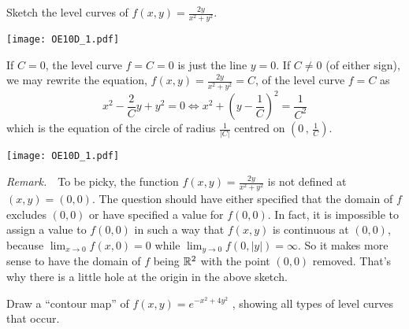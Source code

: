 
\begin{question}[M200 2010D] %
Sketch the level curves of $f(x,y)=\frac{2y}{x^2+y^2}$.
\end{question}

%

\begin{answer}
\begin{center}
     \texttt{[image: OE10D\_1.pdf]}
\end{center}
\end{answer}

\begin{solution}
 If $C=0$, the level curve $f=C=0$ is just the line $y=0$.
If $C\ne 0$ (of either sign), we may rewrite the equation, $f(x,y)=\frac{2y}{x^2+y^2}=C$,
of the level curve $f=C$ as 
\begin{equation*}
x^2-\frac{2}{C}y+y^2=0
\iff x^2+\left(y-\frac{1}{C}\right)^2 =\frac{1}{C^2} 
\end{equation*}
which is the equation of the circle of radius $\frac{1}{|C|}$ centred on
$\left(0\,,\,\frac{1}{C}\right)$.

\begin{center}
     \texttt{[image: OE10D\_1.pdf]}
\end{center}

\emph{Remark.}\ \  
To be picky, the function $f(x,y)=\frac{2y}{x^2+y^2}$
is not defined at $(x,y)=(0,0)$. The question should have either specified
that the domain of $f$ excludes $(0,0)$ or have specified a value 
for $f(0,0)$. In fact, it is impossible to assign a value to $f(0,0)$
in such a way that $f(x,y)$ is continuous at $(0,0)$, because
$\lim_{x\rightarrow 0}f(x,0)=0$ while  $\lim_{y\rightarrow 0}f(0,|y|)=\infty$.
So it makes more sense to have the domain of $f$ being $\mathbb{R}^2$  
with the point $(0,0)$ removed. That's why there is a little hole at the origin
in the above sketch.
\end{solution}


\begin{question}[M200 2011D] %
Draw a ``contour map'' of $f(x, y) = e^{-x^2 +4y^2}$ , showing all types of level curves that occur.
\end{question}

%

